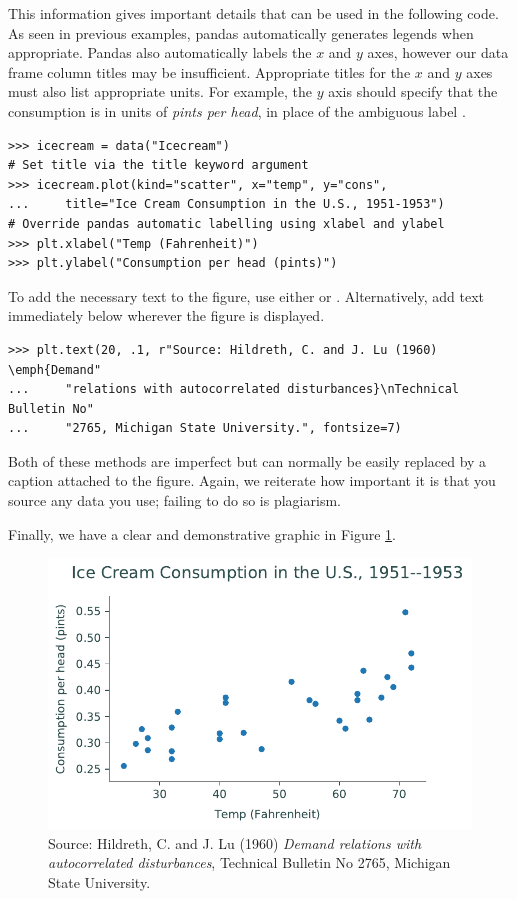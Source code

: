 This information gives important details that can be used in the following code.
As seen in previous examples, pandas automatically generates legends when appropriate.
Pandas also automatically labels the $x$ and $y$ axes, however our data frame column titles may be insufficient.
Appropriate titles for the $x$ and $y$ axes must also list appropriate units.
For example, the $y$ axis should specify that the consumption is in units of \emph{pints per head}, in place of the ambiguous label .

\begin{lstlisting}
>>> icecream = data("Icecream")
# Set title via the title keyword argument
>>> icecream.plot(kind="scatter", x="temp", y="cons", 
...		title="Ice Cream Consumption in the U.S., 1951-1953")
# Override pandas automatic labelling using xlabel and ylabel
>>> plt.xlabel("Temp (Fahrenheit)")
>>> plt.ylabel("Consumption per head (pints)")
\end{lstlisting}

To add the necessary text to the figure, use either  or .
Alternatively, add text immediately below wherever the figure is displayed.

\begin{lstlisting}
>>> plt.text(20, .1, r"Source: Hildreth, C. and J. Lu (1960) \emph{Demand"
...     "relations with autocorrelated disturbances}\nTechnical Bulletin No"
...     "2765, Michigan State University.", fontsize=7)
\end{lstlisting}

Both of these methods are imperfect but can normally be easily replaced by a caption attached to the figure.
Again, we reiterate how important it is that you source any data you use; failing to do so is plagiarism.

Finally, we have a clear and demonstrative graphic in Figure \ref{fig:labels}.

\begin{figure}[H]
    \centering
    \includegraphics[width=.7\textwidth]{figures/ice_cream_good.pdf}
    \caption{Source:  Hildreth, C. and J. Lu (1960) \emph{Demand relations with autocorrelated disturbances}, Technical Bulletin No 2765, Michigan State University.}
    \label{fig:labels}
\end{figure}

